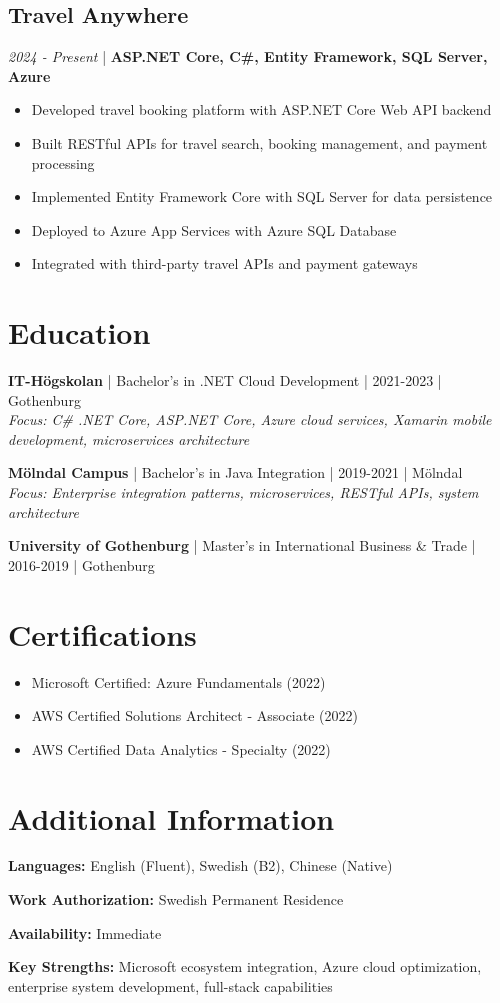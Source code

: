 \documentclass[11pt,a4paper]{article}
\begin{document}
\subsection*{Travel Anywhere}
\textit{2024 - Present} | \textbf{ASP.NET Core, C\#, Entity Framework, SQL Server, Azure}
\begin{itemize}[leftmargin=*, itemsep=1pt]
\item Developed travel booking platform with ASP.NET Core Web API backend
\item Built RESTful APIs for travel search, booking management, and payment processing
\item Implemented Entity Framework Core with SQL Server for data persistence
\item Deployed to Azure App Services with Azure SQL Database
\item Integrated with third-party travel APIs and payment gateways
\end{itemize}

\section*{Education}

\textbf{IT-Högskolan} | Bachelor's in .NET Cloud Development | 2021-2023 | Gothenburg\\
\textit{Focus: C\# .NET Core, ASP.NET Core, Azure cloud services, Xamarin mobile development, microservices architecture}

\textbf{Mölndal Campus} | Bachelor's in Java Integration | 2019-2021 | Mölndal\\
\textit{Focus: Enterprise integration patterns, microservices, RESTful APIs, system architecture}

\textbf{University of Gothenburg} | Master's in International Business \& Trade | 2016-2019 | Gothenburg

\section*{Certifications}

\begin{itemize}[leftmargin=*, itemsep=2pt]
\item Microsoft Certified: Azure Fundamentals (2022)
\item AWS Certified Solutions Architect - Associate (2022)
\item AWS Certified Data Analytics - Specialty (2022)
\end{itemize}

\section*{Additional Information}

\textbf{Languages:} English (Fluent), Swedish (B2), Chinese (Native)

\textbf{Work Authorization:} Swedish Permanent Residence

\textbf{Availability:} Immediate

\textbf{Key Strengths:} Microsoft ecosystem integration, Azure cloud optimization, enterprise system development, full-stack capabilities
\end{document}
